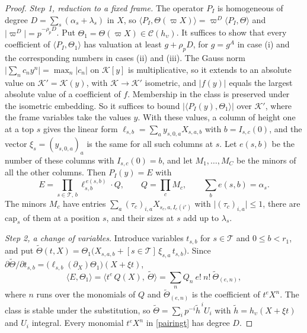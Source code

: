 \begin{proof}
\emph{Step 1, reduction to a fixed frame.} The operator $P_I$ is homogeneous of degree $D=\sum_s(\alpha_s+\lambda_s)$ in $X$, so $\langle P_I,\Theta(\varpi X)\rangle=\varpi^D\langle P_I,\Theta\rangle$ and $\lvert\varpi^D\rvert=p^{-\rho_pD}$. Put $\Theta_1=\Theta(\varpi X)\in\mathcal C(h_\upsilon)$. It suffices to show that every coefficient of $\langle P_I,\Theta_1\rangle$ has valuation at least $g+\rho_pD$, for $g=g^A$ in case (i) and the corresponding numbers in cases (ii) and (iii). The Gauss norm $\lvert\sum_nc_ny^n\rvert=\max_n\lvert c_n\rvert$ on $\mathcal K[y]$ is multiplicative, so it extends to an absolute value on $\mathcal K'=\mathcal K(y)$, with $\mathcal K\to\mathcal K'$ isometric, and $\lvert f(y)\rvert$ equals the largest absolute value of a coefficient of $f$. Membership in the class is preserved under the isometric embedding. So it suffices to bound $\lvert\langle P_I(y),\Theta_1\rangle\rvert$ over $\mathcal K'$, where the frame variables take the values $y$. With these values, a column of height one at a top $s$ gives the linear form $\ell_{s,b}=\sum_ay_{s,0,a}X_{s,a,b}$ with $b=I_{s,c}(0)$, and the vector $\xi_s=(y_{s,0,a})_a$ is the same for all such columns at $s$. Let $e(s,b)$ be the number of these columns with $I_{s,c}(0)=b$, and let $M_1,\dots,M_C$ be the minors of all the other columns. Then $P_I(y)=E$ with
\[
E=\prod_{s\in\mathcal T,\,b}\ell_{s,b}^{\,e(s,b)}\cdot Q,\qquad Q=\prod_cM_c,\qquad\sum_be(s,b)=\alpha_s .
\]
The minors $M_c$ have entries $\sum_a(\tau_c)_{i,a}X_{s_c,a,I_c(i')}$ with $\lvert(\tau_c)_{i,a}\rvert\le1$, there are $\mathrm{cap}_s$ of them at a position $s$, and their sizes at $s$ add up to $\lambda_s$.

\emph{Step 2, a change of variables.} Introduce variables $t_{s,b}$ for $s\in\mathcal T$ and $0\le b<r_1$, and put $\widetilde\Theta(t,X)=\Theta_1\big(X_{s,a,b}+[s\in\mathcal T]\,\xi_{s,a}\,t_{s,b}\big)$. Since $\partial\widetilde\Theta/\partial t_{s,b}=\big(\ell_{s,b}(\partial_X)\Theta_1\big)(X+\xi t)$,
\begin{equation}\label{pairingt}
\langle E,\Theta_1\rangle=\big\langle t^{e}\,Q(X),\ \widetilde\Theta\big\rangle=\sum_nQ_n\ e!\ n!\ \widetilde\Theta_{(e,n)},
\end{equation}
where $n$ runs over the monomials of $Q$ and $\widetilde\Theta_{(e,n)}$ is the coefficient of $t^eX^n$. The class is stable under the substitution, so $\widetilde\Theta=\sum_ip^{-i}\widetilde h^{\,i}U_i$ with $\widetilde h=h_\upsilon(X+\xi t)$ and $U_i$ integral. Every monomial $t^eX^n$ in \eqref{pairingt} has degree $D$.


\end{proof}

